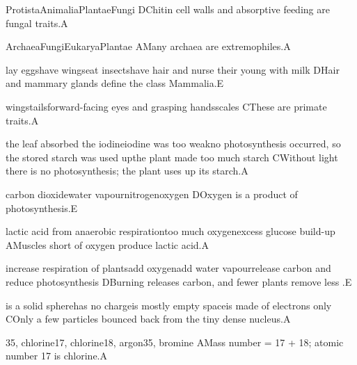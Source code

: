 \begin{gradebody}
{Protista}{Animalia}{Plantae}{Fungi}
{D}{Chitin cell walls and absorptive feeding are fungal traits.}{A}

{Archaea}{Fungi}{Eukarya}{Plantae}
{A}{Many archaea are extremophiles.}{A}

{lay eggs}{have wings}{eat insects}{have hair and nurse their young with milk}
{D}{Hair and mammary glands define the class Mammalia.}{E}

{wings}{tails}{forward-facing eyes and grasping hands}{scales}
{C}{These are primate traits.}{A}

{the leaf absorbed the iodine}{iodine was too weak}{no photosynthesis occurred, so the stored starch was used up}{the plant made too much starch}
{C}{Without light there is no photosynthesis; the plant uses up its starch.}{A}

{carbon dioxide}{water vapour}{nitrogen}{oxygen}
{D}{Oxygen is a product of photosynthesis.}{E}

{lactic acid from anaerobic respiration}{too much oxygen}{excess glucose}{ build-up}
{A}{Muscles short of oxygen produce lactic acid.}{A}

{increase respiration of plants}{add oxygen}{add water vapour}{release carbon and reduce photosynthesis}
{D}{Burning releases carbon, and fewer plants remove less .}{E}

{is a solid sphere}{has no charge}{is mostly empty space}{is made of electrons only}
{C}{Only a few particles bounced back from the tiny dense nucleus.}{A}

{35, chlorine}{17, chlorine}{18, argon}{35, bromine}
{A}{Mass number = 17 + 18; atomic number 17 is chlorine.}{A}


\end{gradebody}
